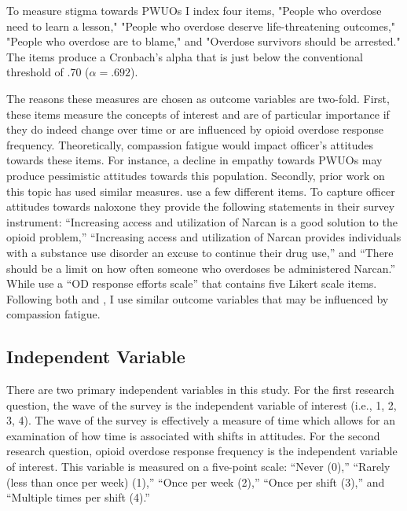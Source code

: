 To measure stigma towards PWUOs I index four items, "People who overdose need to learn a lesson," "People who overdose deserve life-threatening outcomes," "People who overdose are to blame," and "Overdose survivors should be arrested." The items produce a Cronbach's alpha that is just below the conventional threshold of .70 (\(\alpha = .692\)).

The reasons these measures are chosen as outcome variables are two-fold. First, these items measure the concepts of interest and are of particular importance if they do indeed change over time or are influenced by opioid overdose response frequency. Theoretically, compassion fatigue would impact officer's attitudes towards these items. For instance, a decline in empathy towards PWUOs may produce pessimistic attitudes towards this population. Secondly, prior work on this topic has used similar measures. \textcite{murphy_police_2020} use a few different items. To capture officer attitudes towards naloxone they provide the following statements in their survey instrument: “Increasing access and utilization of Narcan is a good solution to the opioid problem,” “Increasing access and utilization of Narcan provides individuals with a substance use disorder an excuse to continue their drug use,” and “There should be a limit on how often someone who overdoses be administered Narcan.” While \textcite{carroll_knowledge_2020} use a “OD response efforts scale” that contains five Likert scale items. Following both \textcite{murphy_police_2020} and \textcite{carroll_knowledge_2020}, I use similar outcome variables that may be influenced by compassion fatigue. 

\subsection{Independent Variable}

There are two primary independent variables in this study. For the first research question, the wave of the survey is the independent variable of interest (i.e., 1, 2, 3, 4). The wave of the survey is effectively a measure of time which allows for an examination of how time is associated with shifts in attitudes. For the second research question, opioid overdose response frequency is the independent variable of interest. This variable is measured on a five-point scale: “Never (0),” “Rarely (less than once per week) (1),” “Once per week (2),” “Once per shift (3),” and “Multiple times per shift (4).”


